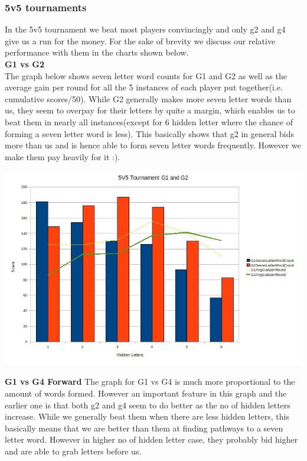 \documentclass[11pt]{article}
\begin{document}
	\subsubsection{5v5 tournaments}
	In the 5v5 tournament we beat most players convincingly and only g2 and g4 give us a run for the money. For the sake of brevity we discuss our relative performance with them in the charts shown below.\\
	\textbf{G1 vs G2}\\
	The graph below shows seven letter word counts for G1 and G2 as well as the average gain per round for all the 5 instances of each player put together(i.e. cumulative scores/50). While G2 generally makes more seven letter words than us, they seem to overpay for their letters by quite a margin, which enables us to beat them in nearly all instances(except for 6 hidden letter where the chance of forming a seven letter word is less). This basically shows that g2 in general bids more than us and is hence able to form seven letter words frequently. However we make them pay heavily for it :).
	\begin{center}
\includegraphics[width=1 \textwidth]{5v5option3G1G2}
\end{center}
	\textbf{G1 vs G4 Forward}
	The graph for G1 vs G4 is much more proportional to the amount of words formed. However an important feature in this graph and the earlier one is that both g2 and g4 seem to do better as the no of hidden letters increase. While we generally beat them when there are less hidden letters, this basically means that we are better than them at finding pathways to a seven letter word. However in higher no of hidden letter case, they probably bid higher and are able to grab letters before us.
\end{document}
